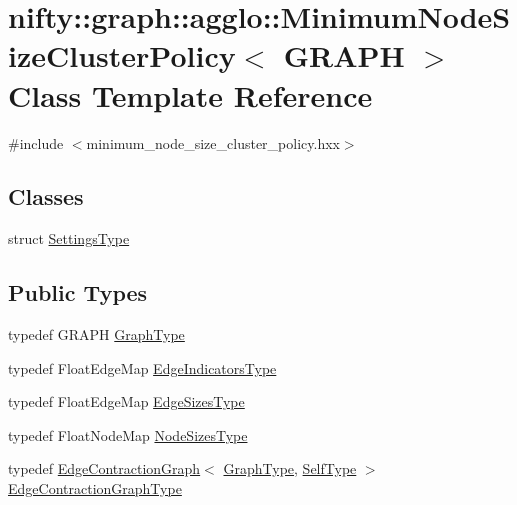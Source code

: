 \hypertarget{classnifty_1_1graph_1_1agglo_1_1MinimumNodeSizeClusterPolicy}{}\section{nifty\+:\+:graph\+:\+:agglo\+:\+:Minimum\+Node\+Size\+Cluster\+Policy$<$ G\+R\+A\+P\+H $>$ Class Template Reference}
\label{classnifty_1_1graph_1_1agglo_1_1MinimumNodeSizeClusterPolicy}


{\ttfamily \#include $<$minimum\+\_\+node\+\_\+size\+\_\+cluster\+\_\+policy.\+hxx$>$}

\subsection*{Classes}
\begin{DoxyCompactItemize}
\item 
struct \hyperlink{structnifty_1_1graph_1_1agglo_1_1MinimumNodeSizeClusterPolicy_1_1SettingsType}{Settings\+Type}
\end{DoxyCompactItemize}
\subsection*{Public Types}
\begin{DoxyCompactItemize}
\item 
typedef G\+R\+A\+P\+H \hyperlink{classnifty_1_1graph_1_1agglo_1_1MinimumNodeSizeClusterPolicy_a6d81a64ca67c9feec052a031552282f0}{Graph\+Type}
\item 
typedef Float\+Edge\+Map \hyperlink{classnifty_1_1graph_1_1agglo_1_1MinimumNodeSizeClusterPolicy_a81a0b54e4eadb98c9a125593b1c6e17c}{Edge\+Indicators\+Type}
\item 
typedef Float\+Edge\+Map \hyperlink{classnifty_1_1graph_1_1agglo_1_1MinimumNodeSizeClusterPolicy_a645ba7b5aabb0fd8cecad292041d929a}{Edge\+Sizes\+Type}
\item 
typedef Float\+Node\+Map \hyperlink{classnifty_1_1graph_1_1agglo_1_1MinimumNodeSizeClusterPolicy_a64f036ec68ecf74d84f9238f77957c1e}{Node\+Sizes\+Type}
\item 
typedef \hyperlink{classnifty_1_1graph_1_1EdgeContractionGraph}{Edge\+Contraction\+Graph}$<$ \hyperlink{classnifty_1_1graph_1_1agglo_1_1MinimumNodeSizeClusterPolicy_a6d81a64ca67c9feec052a031552282f0}{Graph\+Type}, \hyperlink{classnifty_1_1graph_1_1agglo_1_1MinimumNodeSizeClusterPolicy}{Self\+Type} $>$ \hyperlink{classnifty_1_1graph_1_1agglo_1_1MinimumNodeSizeClusterPolicy_a5c67401c61d1d283b73c3ce8a31faeb9}{Edge\+Contraction\+Graph\+Type}
\end{DoxyCompactItemize}
